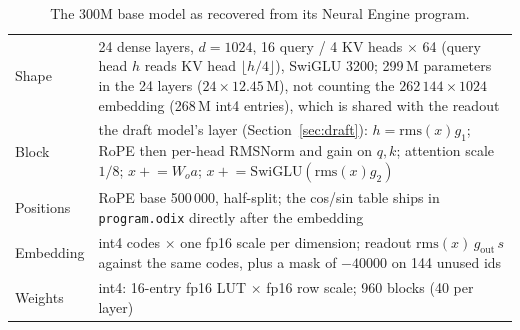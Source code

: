 \documentclass[11pt,reqno]{amsart}
\newcommand{\code}[1]{\texttt{#1}}
\theoremstyle{definition}
\begin{document}
\begin{table}[H]
\centering\small
\begin{tabular}{@{}p{30mm}p{128mm}@{}}
\toprule
Shape & 24 dense layers, $d=1024$, 16 query / 4 KV heads $\times$ 64 (query head $h$ reads KV head $\lfloor h/4\rfloor$), SwiGLU 3200; 299\,M parameters in the 24 layers ($24\times12.45$\,M), not counting the $262\,144\times1024$ embedding (268\,M int4 entries), which is shared with the readout \\
Block & the draft model's layer (Section~\ref{sec:draft}): $h=\mathrm{rms}(x)g_1$; RoPE then per-head RMSNorm and gain on $q,k$; attention scale $1/8$; $x\mathrel{+}=W_oa$; $x\mathrel{+}=\mathrm{SwiGLU}(\mathrm{rms}(x)g_2)$ \\
Positions & RoPE base 500\,000, half-split; the cos/sin table ships in \code{program.odix} directly after the embedding \\
Embedding & int4 codes $\times$ one fp16 scale per dimension; readout $\mathrm{rms}(x)\,g_{\text{out}}\,s$ against the same codes, plus a mask of $-40000$ on 144 unused ids \\
Weights & int4: 16-entry fp16 LUT $\times$ fp16 row scale; 960 blocks (40 per layer) \\
\bottomrule
\end{tabular}
\caption{The 300M base model as recovered from its Neural Engine program.}
\label{tab:pico}
\end{table}
\end{document}

